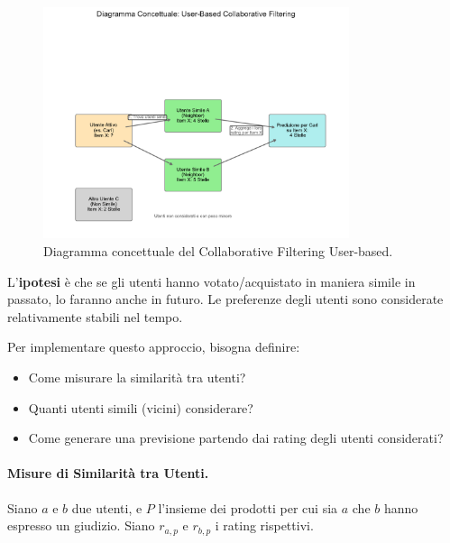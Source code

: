 \documentclass{article}
\begin{document}
\begin{figure}[H]
    \centering
    \includegraphics[width=0.8\textwidth]{images/user_based_cf_diagram.pdf} 
    \caption{Diagramma concettuale del Collaborative Filtering User-based.}
    \label{fig:user_based_cf}
\end{figure}

L'\textbf{ipotesi} è che se gli utenti hanno votato/acquistato in maniera simile in passato, lo faranno anche in futuro. Le preferenze degli utenti sono considerate relativamente stabili nel tempo.

Per implementare questo approccio, bisogna definire:
\begin{itemize}
    \item Come misurare la similarità tra utenti?
    \item Quanti utenti simili (vicini) considerare?
    \item Come generare una previsione partendo dai rating degli utenti considerati?
\end{itemize}

\paragraph{Misure di Similarità tra Utenti.}
Siano $a$ e $b$ due utenti, e $P$ l'insieme dei prodotti per cui sia $a$ che $b$ hanno espresso un giudizio. Siano $r_{a,p}$ e $r_{b,p}$ i rating rispettivi.
\end{document}
